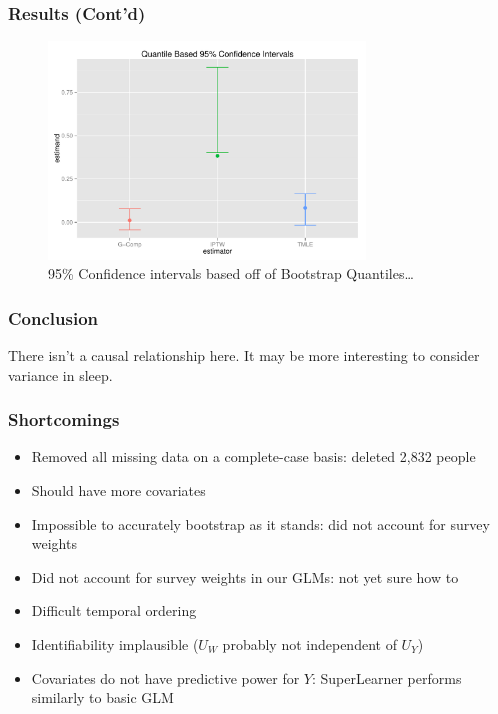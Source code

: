 \documentclass{beamer}
\begin{document}
\begin{frame}
\frametitle{Results (Cont'd)}
\begin{figure}[ht!]
\centering
\includegraphics[width=0.75\textwidth]{bootstrap-quantile-ci.pdf}
\caption{95\% Confidence intervals based off of Bootstrap Quantiles\ldots}
\end{figure}
\end{frame}

\begin{frame}
\frametitle{Conclusion}
There isn't a causal relationship here.
It may be more interesting to consider variance in sleep.
\end{frame}

\begin{frame}
\frametitle{Shortcomings}
  \begin{itemize}
    \vfill\item Removed all missing data on a complete-case basis: deleted 2,832 people
    \vfill\item Should have more covariates
    \vfill\item Impossible to accurately bootstrap as it stands: did not account for survey weights
    \vfill\item Did not account for survey weights in our GLMs: not yet sure how to
    \vfill\item Difficult temporal ordering
    \vfill\item Identifiability implausible ($U_W$ probably not independent of $U_Y$)
    \vfill\item Covariates do not have predictive power for $Y$: SuperLearner performs similarly to basic GLM
  \end{itemize}
  \vfill
\end{frame}
\end{document}

